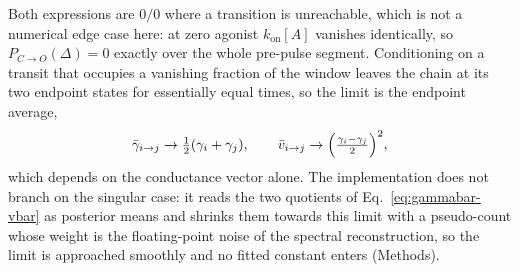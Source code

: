 Both expressions are $0/0$ where a transition is unreachable, which is not a numerical edge case
here: at zero agonist $k_{\mathrm{on}}[A]$ vanishes identically, so $P_{C\to O}(\Delta)=0$ exactly
over the whole pre-pulse segment. Conditioning on a transit that occupies a vanishing fraction of
the window leaves the chain at its two endpoint states for essentially equal times, so the limit is
the endpoint average,
\begin{equation}
  \bar{\gamma}_{i\to j}\to\tfrac12(\gamma_{i}+\gamma_{j}),
  \qquad
  \bar{v}_{i\to j}\to\Bigl(\tfrac{\gamma_{i}-\gamma_{j}}{2}\Bigr)^{2},
  \label{eq:endpoint-limit}
\end{equation}
which depends on the conductance vector alone. The implementation does not branch on the
singular case: it reads the two quotients of Eq.~\ref{eq:gammabar-vbar} as posterior means
and shrinks them towards this limit with a pseudo-count whose weight is the floating-point
noise of the spectral reconstruction, so the limit is approached smoothly and no fitted
constant enters (Methods).
